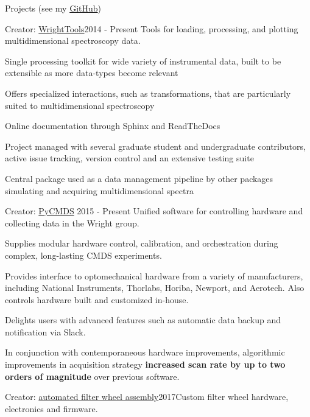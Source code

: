 \documentclass{resume}  %
\begin{document}
\begin{rSection}{Projects (see my \href{https://github.com/untzag}{GitHub})}
  \begin{rSubsection}{Creator: \href{http://wright.tools}{WrightTools}}{2014 - Present}
    {Tools for loading, processing, and plotting multidimensional spectroscopy data.}{}
    \item Single processing toolkit for wide variety of instrumental data, built to be extensible
      as more data-types become relevant
    \item Offers specialized interactions, such as transformations, that are particularly suited to
      multidimensional spectroscopy
    \item Online documentation through Sphinx and ReadTheDocs
    \item Project managed with several graduate student and undergraduate contributors, active
      issue tracking, version control and an extensive testing suite
    \item Central package used as a data management pipeline by other packages simulating and
      acquiring multidimensional spectra
  \end{rSubsection}
  \begin{rSubsection}{Creator: \href{https://github.com/wright-group/PyCMDS}{PyCMDS}}
    {2015 - Present}
    {Unified software for controlling hardware and collecting data in the Wright group.}{}
    \item Supplies modular hardware control, calibration, and orchestration during complex,
      long-lasting CMDS experiments.
    \item Provides interface to optomechanical hardware from a variety of manufacturers, including
      National Instruments, Thorlabs, Horiba, Newport, and Aerotech. Also controls hardware built
      and customized in-house.
    \item Delights users with advanced features such as automatic data backup and notification via
      Slack.
    \item In conjunction with contemporaneous hardware improvements, algorithmic improvements in
      acquisition strategy \textbf{increased scan rate by up to two orders of magnitude} over
      previous software.
  \end{rSubsection}
  \begin{rSubsection}{Creator: \href{https://github.com/wright-group/FilterWheels}{automated filter
        wheel assembly}}{2017}{Custom filter wheel hardware, electronics and firmware.}{}

\end{rSubsection}
\end{rSection}
\end{document}
